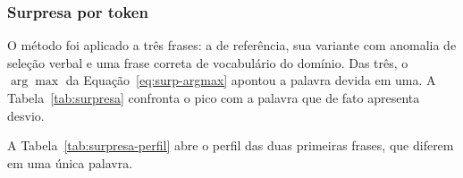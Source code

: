 \subsubsection{Surpresa por token}
\label{res:surpresa}

O método foi aplicado a três frases: a de referência, sua variante com anomalia de seleção
verbal e uma frase correta de vocabulário do domínio. Das três, o
$\arg\max$ da Equação~\ref{eq:surp-argmax} apontou a palavra devida em uma. A
Tabela~\ref{tab:surpresa} confronta o pico com a palavra que de fato apresenta desvio.

\begin{table}[H]
\centering
{}
\caption{O pico de surpresa, em nats, confrontado com a palavra que apresenta desvio.}
\label{tab:surpresa}
\end{table}

A Tabela~\ref{tab:surpresa-perfil} abre o perfil das duas primeiras frases, que diferem em uma
única palavra.

